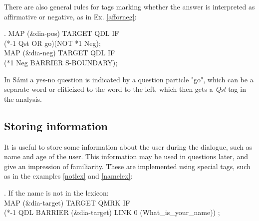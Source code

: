 \documentclass[11pt]{article}
\begin{document}
There are also general rules for tags marking whether the answer is interpreted as affirmative or negative, as in Ex. \ref{afforneg}:

\ex.\flushleft\label{afforneg} \small{MAP (\&dia-pos) TARGET QDL IF \\ (*-1 Qst OR go)(NOT *1 Neg); \\
MAP (\&dia-neg) TARGET QDL IF \\(*1 Neg BARRIER S-BOUNDARY);} 

In Sámi a yes-no question is indicated by a question particle "go", which can be a separate word or cliticized to the word to the left, which then gets a \textit{Qst} tag in the analysis.
 
 


\subsection{Storing information}
It is useful to store some information about the user during the dialogue, such as name and age of the user. This information may be used in questions later, and give an impression of familiarity. These are implemented using special tags, such as in the examples \ref{notlex} and \ref{namelex}: 

\ex.\flushleft\label{notlex} \small{If the name is not in the lexicon: \\
MAP (\&dia-target) TARGET QMRK IF \\(*-1 QDL BARRIER (\&dia-target) LINK 0 (What\_is\_your\_name)) ;}
\end{document}
